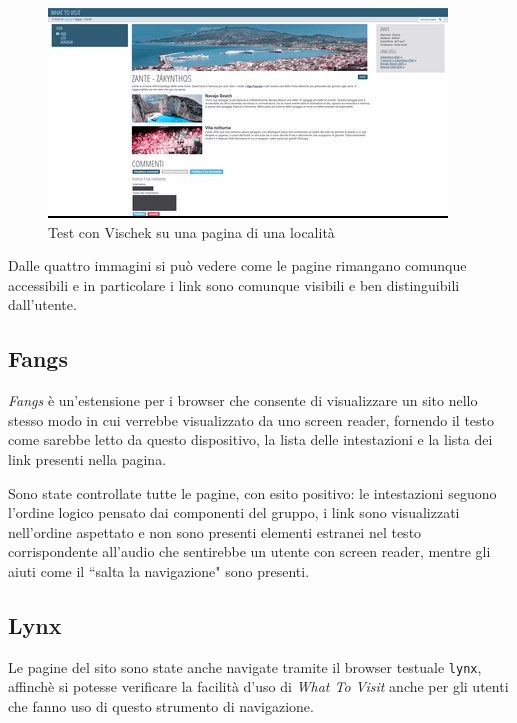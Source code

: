 \begin{figure}[H]
\begin{minipage}{0.45\textwidth}
\end{minipage}
\hspace{\fill}
\begin{minipage}{0.45\textwidth}
\includegraphics[width=\linewidth]{images/screen/tritanope.jpg}
\end{minipage}
\caption{Test con Vischek su una pagina di una località}\label{multiavp}
\end{figure}

Dalle quattro immagini si può vedere come le pagine rimangano comunque accessibili e
in particolare i link sono comunque visibili e ben distinguibili dall'utente.

\subsection{Fangs}\label{sec:fangs}
\textit{Fangs} è un'estensione per i browser che consente di visualizzare un
sito nello stesso modo in cui verrebbe visualizzato da uno screen reader,
fornendo il testo come sarebbe letto da questo dispositivo, la lista delle
intestazioni e la lista dei link presenti nella pagina.

Sono state controllate tutte le pagine, con esito positivo: le intestazioni
seguono l'ordine logico pensato dai componenti del gruppo, i link sono
visualizzati nell'ordine aspettato e non sono presenti elementi estranei nel
testo corrispondente all'audio che sentirebbe un utente con screen reader,
mentre gli aiuti come il ``salta la navigazione" sono presenti.

\subsection{Lynx}\label{sec:lynx}
Le pagine del sito sono state anche navigate tramite il browser testuale
\texttt{lynx}, affinchè si potesse verificare la facilità d'uso di
\textit{What To Visit} anche per gli utenti che fanno uso di questo
strumento di navigazione.

